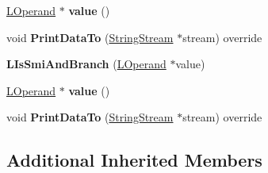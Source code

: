 \begin{DoxyCompactItemize}
\item 
\hyperlink{classv8_1_1internal_1_1_l_operand}{L\+Operand} $\ast$ {\bfseries value} ()\hypertarget{classv8_1_1internal_1_1_l_is_smi_and_branch_a903a8ec3f0a10a5aa477caa1c075c39c}{}\label{classv8_1_1internal_1_1_l_is_smi_and_branch_a903a8ec3f0a10a5aa477caa1c075c39c}

\item 
void {\bfseries Print\+Data\+To} (\hyperlink{classv8_1_1internal_1_1_string_stream}{String\+Stream} $\ast$stream) override\hypertarget{classv8_1_1internal_1_1_l_is_smi_and_branch_a21b9b710370fd9c16d546c5a24952094}{}\label{classv8_1_1internal_1_1_l_is_smi_and_branch_a21b9b710370fd9c16d546c5a24952094}

\item 
{\bfseries L\+Is\+Smi\+And\+Branch} (\hyperlink{classv8_1_1internal_1_1_l_operand}{L\+Operand} $\ast$value)\hypertarget{classv8_1_1internal_1_1_l_is_smi_and_branch_a6cce4ceaabb88e20d423459b58284ea7}{}\label{classv8_1_1internal_1_1_l_is_smi_and_branch_a6cce4ceaabb88e20d423459b58284ea7}

\item 
\hyperlink{classv8_1_1internal_1_1_l_operand}{L\+Operand} $\ast$ {\bfseries value} ()\hypertarget{classv8_1_1internal_1_1_l_is_smi_and_branch_a903a8ec3f0a10a5aa477caa1c075c39c}{}\label{classv8_1_1internal_1_1_l_is_smi_and_branch_a903a8ec3f0a10a5aa477caa1c075c39c}

\item 
void {\bfseries Print\+Data\+To} (\hyperlink{classv8_1_1internal_1_1_string_stream}{String\+Stream} $\ast$stream) override\hypertarget{classv8_1_1internal_1_1_l_is_smi_and_branch_a21b9b710370fd9c16d546c5a24952094}{}\label{classv8_1_1internal_1_1_l_is_smi_and_branch_a21b9b710370fd9c16d546c5a24952094}

\end{DoxyCompactItemize}
\subsection*{Additional Inherited Members}


